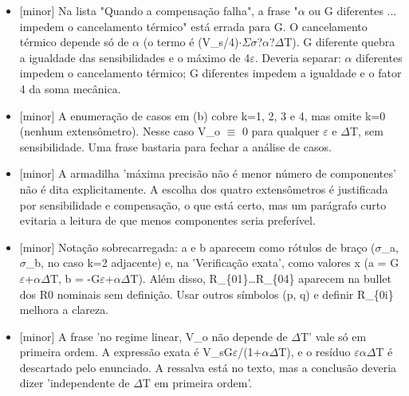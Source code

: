 \documentclass{article}%
\begin{document}
\begin{itemize}%
\item%
{[}minor{]} Na lista "Quando a compensação falha", a frase "$\alpha$ ou G diferentes ... impedem o cancelamento térmico" está errada para G. O cancelamento térmico depende só de $\alpha$ (o termo é (V\_s/4)$\cdot$$\Sigma$$\sigma$?$\alpha$?$\Delta$T). G diferente quebra a igualdade das sensibilidades e o máximo de 4$\varepsilon$. Deveria separar: $\alpha$ diferentes impedem o cancelamento térmico; G diferentes impedem a igualdade e o fator 4 da soma mecânica.%
\item%
{[}minor{]} A enumeração de casos em (b) cobre k=1, 2, 3 e 4, mas omite k=0 (nenhum extensômetro). Nesse caso V\_o $\equiv$ 0 para qualquer $\varepsilon$ e $\Delta$T, sem sensibilidade. Uma frase bastaria para fechar a análise de casos.%
\item%
{[}minor{]} A armadilha 'máxima precisão não é menor número de componentes' não é dita explicitamente. A escolha dos quatro extensômetros é justificada por sensibilidade e compensação, o que está certo, mas um parágrafo curto evitaria a leitura de que menos componentes seria preferível.%
\item%
{[}minor{]} Notação sobrecarregada: a e b aparecem como rótulos de braço ($\sigma$\_a, $\sigma$\_b, no caso k=2 adjacente) e, na 'Verificação exata', como valores x (a = G$\varepsilon$+$\alpha$$\Delta$T, b = -G$\varepsilon$+$\alpha$$\Delta$T). Além disso, R\_\{01\}\ldots{}R\_\{04\} aparecem na bullet dos R0 nominais sem definição. Usar outros símbolos (p, q) e definir R\_\{0i\} melhora a clareza.%
\item%
{[}minor{]} A frase 'no regime linear, V\_o não depende de $\Delta$T' vale só em primeira ordem. A expressão exata é V\_sG$\varepsilon$/(1+$\alpha$$\Delta$T), e o resíduo $\varepsilon$$\alpha$$\Delta$T é descartado pelo enunciado. A ressalva está no texto, mas a conclusão deveria dizer 'independente de $\Delta$T em primeira ordem'.%
\end{itemize}%
\end{document}
